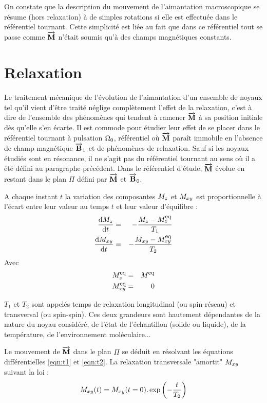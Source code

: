 On constate que la description du mouvement de l'aimantation
macroscopique se résume (hors relaxation) à de simples rotations
si elle est effectuée dans le référentiel tournant.
Cette simplicité est liée au fait que dans ce référentiel tout
se passe comme $\overrightarrow{\mathbf{M}}$ n'était soumis qu'à des champs magnétiques constants.

\section{Relaxation}
Le traitement mécanique de l'évolution de l'aimantation d'un ensemble de noyaux tel
qu'il vient d'être traité néglige complètement l'effet de la relaxation, c'est à dire de
l'ensemble des phénomènes qui tendent à ramener $\overrightarrow{\mathbf{M}}$ à sa position initiale dès qu'elle
s'en écarte.
Il est commode pour étudier leur effet de se placer dans le référentiel
tournant à pulsation $\Omega_0$, référentiel où $\overrightarrow{\mathbf{M}}$ paraît immobile en
l'absence de champ magnétique $\overrightarrow{\mathbf{B}}_1$ et de phénomènes de relaxation.
Sauf si les noyaux étudiés sont en résonance, il ne s'agit pas du référentiel tournant
au sens où il a été défini au paragraphe précédent.
Dans le référentiel d'étude, $\overrightarrow{\mathbf{M}}$ évolue en restant dans le plan $\Pi$ défini par $\overrightarrow{\mathbf{M}}$
et $\overrightarrow{\mathbf{B}}_0$.

A chaque instant $t$ la variation des composantes $M_z$ et $M_{xy}$ est proportionnelle à l'écart
entre leur valeur au temps $t$ et leur valeur d'équilibre :
\begin{eqnarray}
\label{eqn:t1}
\frac{\mbox{d}M_z}{\mbox{d} t} & = & -\frac{M_z - M^{\mbox{\footnotesize{eq}}}_z}{T_1} \\
\label{eqn:t2}
\frac{\mbox{d}M_{xy}}{\mbox{d} t} & = & -\frac{M_{xy} - M^{\mbox{\footnotesize{eq}}}_{xy}}{T_2}
\end{eqnarray}
Avec
\begin{eqnarray}
M^{\mbox{\footnotesize{eq}}}_z & = & M^{\mbox{\footnotesize{eq}}} \\
M^{\mbox{\footnotesize{eq}}}_{xy} & = & 0
\end{eqnarray}

$T_1$ et $T_2$ sont appelés temps de relaxation longitudinal (ou spin-réseau)
et transversal (ou spin-spin).
Ces deux grandeurs sont hautement dépendantes de la nature du noyau
considéré, de l'état de l'échantillon (solide ou liquide), de la température, de
l'environnement moléculaire...

Le mouvement de $\overrightarrow{\mathbf{M}}$ dans le plan $\Pi$ se déduit en résolvant les équations
différentielles \ref{eqn:t1} et \ref{eqn:t2}.
La relaxation transversale "amortit" $M_{xy}$
suivant la loi :
\begin{equation}
M_{xy} (t) = M_{xy} (t=0) . \exp \left( -\frac{t}{T_2} \right)
\end{equation}

